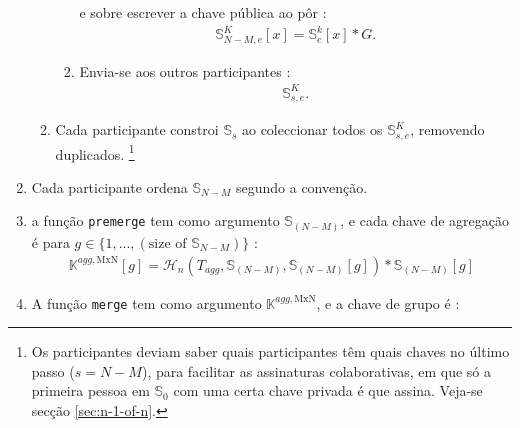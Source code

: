 \begin{enumerate}
\begin{enumerate}
\begin{enumerate}
e sobre escrever a chave pública ao pôr :
\begin{align*}
\mathbb{S}^K_{N-M,e}[x] = \mathbb{S}^{k}_{e}[x]*G .
\end{align*}
            \item Envia-se aos outros participantes :
\begin{align*}
\mathbb{S}^K_{s,e} .
\end{align*}
        \end{enumerate}
        \item Cada participante constroi $\mathbb{S}_{s}$ ao coleccionar todos os $\mathbb{S}^K_{s,e}$, removendo duplicados. 
\footnote{Os participantes deviam saber quais participantes têm quais chaves no último passo ($s = N-M$), para facilitar as assinaturas colaborativas, em que só a primeira pessoa em $\mathbb{S}_0$ com uma certa chave privada é que assina. Veja-se secção \ref{sec:n-1-of-n}.}
    \end{enumerate}
    \item Cada participante ordena $\mathbb{S}_{N-M}$ segundo a convenção.
    \item a função {\tt premerge} tem como argumento $\mathbb{S}_{(N-M)}$, e cada chave de agregação é para $g \in \{1,...,(\textrm{size of }\mathbb{S}_{N-M})\}$ :\vspace{.1cm} 
\begin{align*}
\mathbb{K}^{agg,\textrm{MxN}}[g] = \mathcal{H}_n(T_{agg},\mathbb{S}_{(N-M)},\mathbb{S}_{(N-M)}[g])*\mathbb{S}_{(N-M)}[g]
\end{align*}
    \item A função {\tt merge} tem como argumento $\mathbb{K}^{agg,\textrm{MxN}}$, e a chave de grupo é :\vspace{.175cm} 

\end{enumerate}
